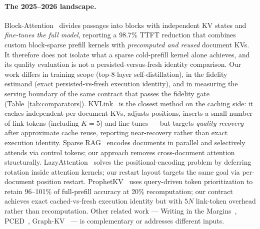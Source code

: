 \paragraph{The 2025--2026 landscape.}
Block-Attention~\citep{ma2025blockattention} divides passages into blocks
with independent KV states and \emph{fine-tunes the full model}, reporting a
98.7\% TTFT reduction that combines custom block-sparse prefill kernels with
\emph{precomputed and reused} document KVs. It therefore does not isolate
what a sparse cold-prefill kernel alone achieves, and its quality evaluation
is not a persisted-versus-fresh identity comparison. Our work differs in
training scope (top-8-layer self-distillation), in the fidelity estimand
(exact persisted-vs-fresh execution identity), and in measuring the serving
boundary of the same contract that passes the fidelity gate
(Table~\ref{tab:comparators}).
KVLink~\citep{yang2025kvlink} is the closest method on the caching side: it
caches independent per-document KVs, adjusts positions, inserts a small
number of link tokens (including $K{=}5$) and fine-tunes --- but targets
\emph{quality recovery} after approximate cache reuse, reporting
near-recovery rather than exact execution identity. Sparse
RAG~\citep{zhu2025sparserag} encodes documents in parallel and
selectively attends via control tokens; our approach removes cross-document
attention structurally. LazyAttention~\citep{xia2026lazyattention} solves
the positional-encoding problem by deferring rotation inside attention
kernels; our restart layout targets the same goal via per-document position
restart. ProphetKV~\citep{wang2026prophetkv} uses query-driven token
prioritization to retain 96--101\% of full-prefill accuracy at 20\%
recomputation; our contract achieves exact cached-vs-fresh execution
identity but with $5N$ link-token overhead rather than recomputation. Other
related work --- Writing in the Margins~\citep{russak2024wim},
PCED~\citep{corallo2026pced}, Graph-KV~\citep{wang2025graphkv} --- is
complementary or addresses different inputs.

